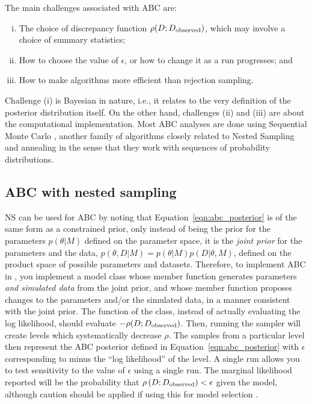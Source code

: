 \documentclass[article, nojss]{jss}
\begin{document}
The main challenges associated with ABC are:
\begin{enumerate}[(i)]
\item The choice of discrepancy function $\rho(D; D_{\rm observed})$, which
may involve a choice of summary statistics;
\item How to choose the value of $\epsilon$, or how to change it as a run
progresses; and
\item How to make algorithms more efficient than rejection sampling.
\end{enumerate}
Challenge (i) is Bayesian in nature, i.e., it relates to the very
definition of the posterior distribution itself.
On the other hand, challenges (ii) and (iii) are about the computational
implementation. Most ABC analyses are done using Sequential Monte Carlo
\citep[SMC; ][]{del2012adaptive}, another family of algorithms closely related
to Nested Sampling and annealing in the sense that they work with
sequences of probability distributions.

\subsection{ABC with nested sampling}
NS can be used for ABC by noting that Equation~\ref{eqn:abc_posterior}
is of the same form as a constrained prior, only instead of being the prior
for the parameters $p(\theta | M)$ defined on the parameter space, it is
the {\em joint prior} for the parameters and the data,
$p(\theta, D |M) = p(\theta | M)p(D | \theta, M)$, defined on the product
space of possible parameters and datasets. Therefore, to implement
ABC in , you implement a model class
whose  member function generates parameters {\em and simulated
data} from the joint prior, and whose  member function
proposes changes to the parameters and/or the simulated data, in a
manner consistent with the joint prior. The  function
of the class, instead of actually evaluating the log likelihood, should
evaluate $-\rho(D; D_{\rm observed})$. Then, running the sampler
will create levels which systematically decrease $\rho$. The samples from
a particular level then represent the ABC posterior defined in
Equation~\ref{eqn:abc_posterior} with $\epsilon$ corresponding to minus
the ``log likelihood'' of the level.
A single  run allows you to test sensitivity
to the value of $\epsilon$ using a single run.
The marginal likelihood reported will be
the probability that $\rho\left(D; D_{\rm observed}\right) < \epsilon$
given the model, although caution should be applied if
using this for model selection \citep{robert2011lack}.
\end{document}
